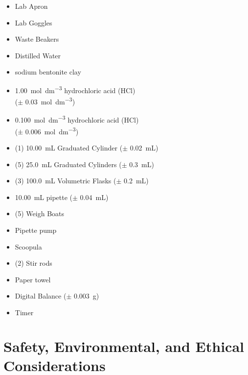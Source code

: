 \documentclass[11pt, letterpaper]{article}
\begin{document}
\begin{multicols}{2}
    \begin{itemize}
        \item Lab Apron
        \item Lab Goggles
        \item Waste Beakers
        \item Distilled Water
        \item sodium bentonite clay
        \item \SI{1.00}{mol.dm^{-3}} hydrochloric acid (HCl) \\ (\(\pm\) \SI{0.03}{mol.dm^{-3}})
        \item \SI{0.100}{mol.dm^{-3}} hydrochloric acid (HCl) \\ (\(\pm\) \SI{0.006}{mol.dm^{-3}})
        \item (1) \SI{10.00}{mL} Graduated Cylinder (\(\pm\) \SI{0.02}{mL})
        \item (5) \SI{25.0}{mL} Graduated Cylinders (\(\pm\) \SI{0.3}{mL})
        \item (3) \SI{100.0}{mL} Volumetric Flasks (\(\pm\) \SI{0.2}{mL})
        \item \SI{10.00}{mL} pipette (\(\pm\) \SI{0.04}{mL})
        \item (5) Weigh Boats
        \item Pipette pump
        \item Scoopula
        \item (2) Stir rods
        \item Paper towel
        \item Digital Balance (\(\pm\) \SI{0.003}{g})
        \item Timer
    \end{itemize}

\end{multicols}

\section{Safety, Environmental, and Ethical Considerations}
\end{document}
